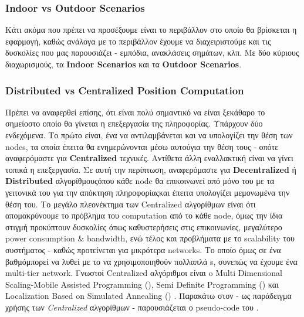 \subsubsection{Indoor vs Outdoor Scenarios}
Κάτι ακόμα που πρέπει να προσέξουμε είναι το περιβάλλον στο οποίο θα βρίσκεται η εφαρμογή, καθώς ανάλογα με το περιβάλλον\udot
έχουμε να διαχειριστούμε και τις δυσκολίες που μας παρουσιάζει - εμπόδια, ανακλάσεις σημάτων, κλπ. Με δύο κύριους διαχωρισμούς,
τα \textbf{Indoor Scenarios} και τα \textbf{Outdoor Scenarios}.

\subsubsection{Distributed vs Centralized Position Computation}
Πρέπει να αναφερθεί επίσης, ότι είναι πολύ σημαντικό να είναι ξεκάθαρο το σημείο\udot στο οποίο
θα γίνεται η επεξεργασία της πληροφορίας. Υπάρχουν δύο ενδεχόμενα. Το πρώτο
είναι, ένα  να αντιλαμβάνεται και να υπολογίζει την θέση των nodes, τα οποία
έπειτα θα ενημερώνονται μέσω αυτού\udot για την θέση τους - οπότε αναφερόμαστε για \textbf{Centralized} τεχνικές. Αντίθετα άλλη εναλλακτική 
είναι να γίνει τοπικά η επεξεργασία. Σε αυτή την περίπτωση, αναφερόμαστε για \textbf{Decentralized} ή \textbf{Distri\-bu\-ted} αλγορίθμους\udot όπου κάθε node θα 
επικοινωνεί από μόνο του με τα γειτονικά του για την απόκτηση πληροφορίας\udot και έπειτα υπολογίζει μεμονωμένα την θέση του. 
Το μεγάλο πλεονέκτημα των Centralized αλγορίθμων είναι ότι απομακρύνουμε το πρόβλημα του computation από το κάθε node, όμως την ίδια στιγμή
προκύπτουν δυσκολίες όπως καθυστερήσεις στις επικοινωνίες, μεγαλύτερο power consumption \& bandwidth, ενώ τέλος
και προβλήματα με το scalability του συστήματος - καθώς προτείνεται για μικρότερα networks. Το οποίο όμως σε ένα βαθμό\udot μπορεί να λυθεί
με το να χρησιμοποιηθούν πολλαπλά s, συνεπώς να έχουμε ένα multi-tier network.
Γνωστοί Centralized αλγόριθμοι είναι o Multi Dimensional Scaling-Mobile Assisted Programming (), 
Semi Definite Programming () και Localization Based on Simulated Annealing () \cite{range-distributed}.
Παρακάτω στον  - ως παράδειγμα
χρήσης των \emph{Centralized} αλγορίθμων - παρουσιάζεται ο pseudo-code του .

